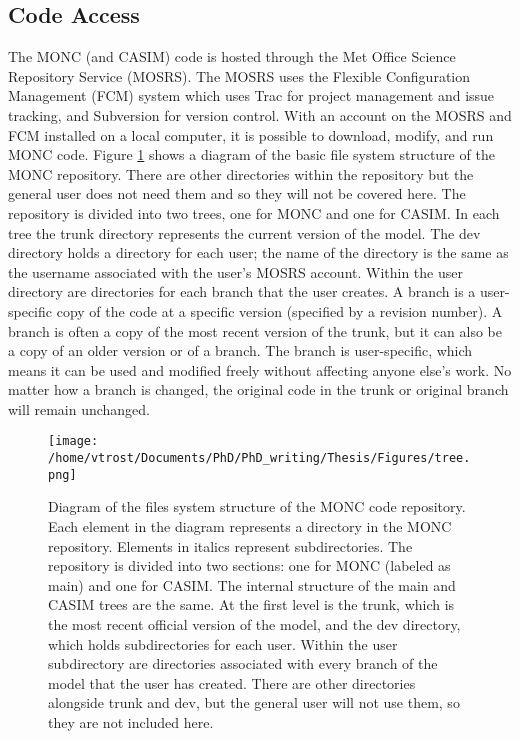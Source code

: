 \subsection{Code Access}
The MONC (and CASIM) code is hosted through the Met Office Science Repository Service (MOSRS). The MOSRS uses the Flexible Configuration Management (FCM) system which uses Trac for project management and issue tracking, and Subversion for version control. With an account on the MOSRS and FCM installed on a local computer, it is possible to download, modify, and run MONC code. \citep{moncGuides}
\newpage
Figure \ref{fig:tree} shows a diagram of the basic file system structure of the MONC repository. There are other directories within the repository but the general user does not need them and so they will not be covered here. The repository is divided into two trees, one for MONC and one for CASIM. In each tree the trunk directory represents the current version of the model. The dev directory holds a directory for each user; the name of the directory is the same as the username associated with the user's MOSRS account. Within the user directory are directories for each branch that the user creates. A branch is a user-specific copy of the code at a specific version (specified by a revision number). A branch is often a copy of the most recent version of the trunk, but it can also be a copy of an older version or of a branch. The branch is user-specific, which means it can be used and modified freely without affecting anyone else's work. No matter how a branch is changed, the original code in the trunk or original branch will remain unchanged.

\begin{figure}[H]
	\centering
	\texttt{[image: /home/vtrost/Documents/PhD/PhD\_writing/Thesis/Figures/tree.png]}
	\caption{Diagram of the files system structure of the MONC code repository. Each element in the diagram represents a directory in the MONC repository. Elements in italics represent subdirectories. The repository is divided into two sections: one for MONC (labeled as main) and one for CASIM. The internal structure of the main and CASIM trees are the same. At the first level is the trunk, which is the most recent official version of the model, and the dev directory, which holds subdirectories for each user. Within the user subdirectory are directories associated with every branch of the model that the user has created. There are other directories alongside trunk and dev, but the general user will not use them, so they are not included here.}
	\label{fig:tree}
\end{figure}

